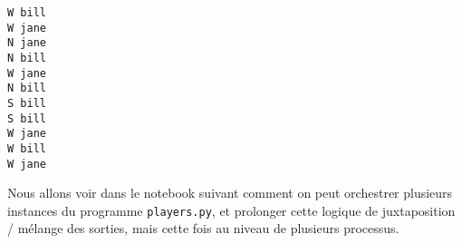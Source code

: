     \begin{Verbatim}[commandchars=\\\{\},frame=single,framerule=0.3mm,rulecolor=\color{cellframecolor}]
W bill
W jane
N jane
N bill
W jane
N bill
S bill
S bill
W jane
W bill
W jane
\end{Verbatim}

    Nous allons voir dans le notebook suivant comment on peut orchestrer
plusieurs instances du programme \texttt{players.py}, et prolonger cette
logique de juxtaposition / mélange des sorties, mais cette fois au
niveau de plusieurs processus.


    
    
    
